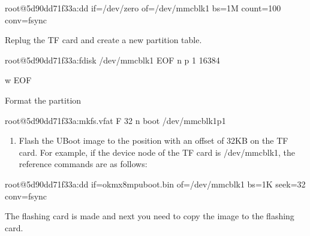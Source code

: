 \documentclass[letterpaper,10pt,openany,english]{sphinxmanual}
\begin{document}
\begin{sphinxVerbatim}[commandchars=\\\{\}]
root@5d90dd71f33a:dd if=/dev/zero of=/dev/mmcblk1 bs=1M count=100 conv=fsync
\end{sphinxVerbatim}

\sphinxAtStartPar
Replug the TF card and create a new partition table.

\begin{sphinxVerbatim}[commandchars=\\\{\}]
root@5d90dd71f33a:fdisk /dev/mmcblk1 \PYGZlt{}\PYGZlt{} EOF
n
p
1
16384

w
EOF
\end{sphinxVerbatim}

\sphinxAtStartPar
Format the partition

\begin{sphinxVerbatim}[commandchars=\\\{\}]
root@5d90dd71f33a:mkfs.vfat \PYGZhy{}F 32 \PYGZhy{}n \PYGZdq{}boot\PYGZdq{} /dev/mmcblk1p1
\end{sphinxVerbatim}
\begin{enumerate}
%
\setcounter{enumi}{1}
\item {} 
\sphinxAtStartPar
Flash the U\sphinxhyphen{}Boot image to the position with an offset of 32KB on the TF card. For example, if the device node of the TF card is /dev/mmcblk1, the reference commands are as follows:

\end{enumerate}

\begin{sphinxVerbatim}[commandchars=\\\{\}]
root@5d90dd71f33a:dd if=ok\PYGZhy{}mx8mp\PYGZhy{}uboot.bin of=/dev/mmcblk1 bs=1K seek=32 conv=fsync
\end{sphinxVerbatim}

\sphinxAtStartPar
The flashing card is made and next you need to copy the image to the flashing card.
\end{document}
